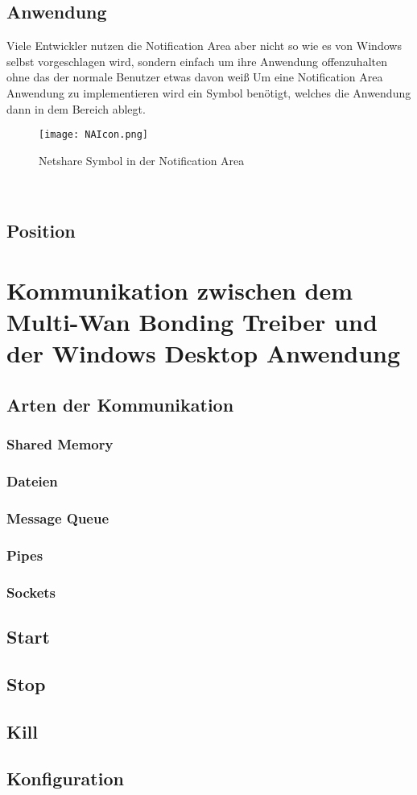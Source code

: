 \subsection{Anwendung}
Viele Entwickler nutzen die Notification Area aber nicht so wie es von Windows selbst vorgeschlagen wird, sondern einfach um ihre Anwendung offenzuhalten ohne das der normale Benutzer etwas davon weiß
\newline
\newline
Um eine Notification Area Anwendung zu implementieren wird ein Symbol benötigt, welches die Anwendung dann in dem Bereich ablegt. 
\begin{figure}[H]
    \centering
    \texttt{[image: NAIcon.png]}
    \caption[NotificationArea]{Netshare Symbol in der Notification Area} 
\end{figure}
\  \\

\subsection{Position}


\section{Kommunikation zwischen dem Multi-Wan Bonding Treiber und der Windows Desktop Anwendung}
\subsection{Arten der Kommunikation}
\subsubsection{Shared Memory}
\subsubsection{Dateien}
\subsubsection{Message Queue}
\subsubsection{Pipes}
\subsubsection{Sockets}

\subsection{Start}
\subsection{Stop}
\subsection{Kill}
\subsection{Konfiguration}